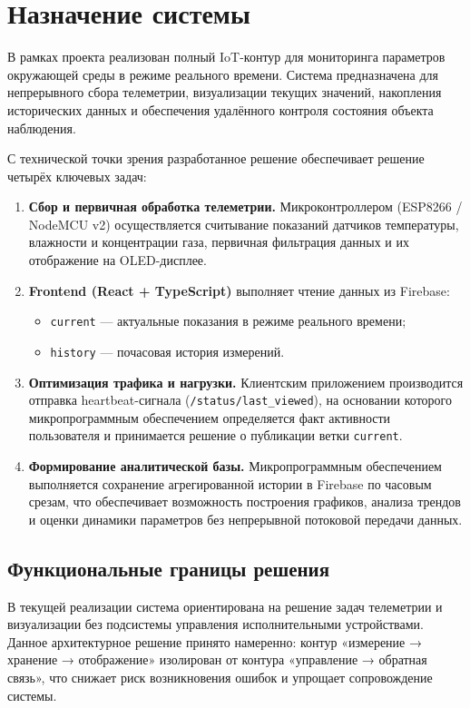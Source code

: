 \section{Назначение системы}

В рамках проекта реализован полный IoT-контур для мониторинга параметров окружающей среды в режиме реального времени. Система предназначена для непрерывного сбора телеметрии, визуализации текущих значений, накопления исторических данных и обеспечения удалённого контроля состояния объекта наблюдения.

С технической точки зрения разработанное решение обеспечивает решение четырёх ключевых задач:

\begin{enumerate}
    \item \textbf{Сбор и первичная обработка телеметрии.} Микроконтроллером (ESP8266 / NodeMCU v2) осуществляется считывание показаний датчиков температуры, влажности и концентрации газа, первичная фильтрация данных и их отображение на OLED-дисплее.
    \item \textbf{Frontend (React + TypeScript)} выполняет чтение данных из Firebase:
    \begin{itemize}
        \item \texttt{current} --- актуальные показания в режиме реального времени;
        \item \texttt{history} --- почасовая история измерений.
    \end{itemize}
    \item \textbf{Оптимизация трафика и нагрузки.} Клиентским приложением производится отправка heartbeat-сигнала (\texttt{/status/last\_viewed}), на основании которого микропрограммным обеспечением определяется факт активности пользователя и принимается решение о публикации ветки \texttt{current}.
    \item \textbf{Формирование аналитической базы.} Микропрограммным обеспечением выполняется сохранение агрегированной истории в Firebase по часовым срезам, что обеспечивает возможность построения графиков, анализа трендов и оценки динамики параметров без непрерывной потоковой передачи данных.
\end{enumerate}

\subsection{Функциональные границы решения}

В текущей реализации система ориентирована на решение задач телеметрии и визуализации без подсистемы управления исполнительными устройствами. Данное архитектурное решение принято намеренно: контур «измерение → хранение → отображение» изолирован от контура «управление → обратная связь», что снижает риск возникновения ошибок и упрощает сопровождение системы.

